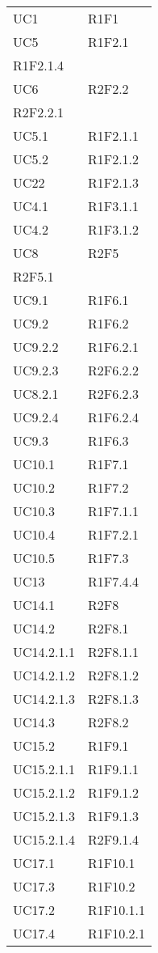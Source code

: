 \begin{longtable}{|C{6.5cm}|C{6.5cm}|}
	\tabularnewline

	UC1 & R1F1 \\
	UC5 & \centering R1F2.1 \\ R1F2.1.4 \tabularnewline
	UC6 & \centering R2F2.2 \\ R2F2.2.1 \tabularnewline
	UC5.1 & R1F2.1.1 \\
	UC5.2 & R1F2.1.2 \\
	UC22 & R1F2.1.3 \\
	UC4.1 & R1F3.1.1 \\
	UC4.2 & R1F3.1.2 \\
	UC8 & \centering R2F5 \\ R2F5.1 \tabularnewline
	UC9.1 & R1F6.1 \\
    UC9.2 & R1F6.2 \\
    UC9.2.2 & R1F6.2.1 \\
    UC9.2.3 & R2F6.2.2 \\
    UC8.2.1 & R2F6.2.3 \\
    UC9.2.4 & R1F6.2.4 \\
	UC9.3 & R1F6.3 \\
	UC10.1 & R1F7.1 \\
	UC10.2 & R1F7.2 \\
	UC10.3 & R1F7.1.1 \\
	UC10.4 & R1F7.2.1 \\
	UC10.5 & R1F7.3 \\
	UC13 & R1F7.4.4 \\
	UC14.1 & R2F8 \\
	UC14.2 & R2F8.1 \\
	UC14.2.1.1 & R2F8.1.1 \\
	UC14.2.1.2 & R2F8.1.2 \\
	UC14.2.1.3 & R2F8.1.3 \\
	UC14.3 & R2F8.2 \\
	UC15.2 & R1F9.1 \\
	UC15.2.1.1 & R1F9.1.1 \\
	UC15.2.1.2 & R1F9.1.2 \\
	UC15.2.1.3 & R1F9.1.3 \\
	UC15.2.1.4 & R2F9.1.4 \\
	UC17.1 & R1F10.1 \\
	UC17.3 & R1F10.2 \\
	UC17.2 & R1F10.1.1 \\
	UC17.4 & R1F10.2.1 \\

\end{longtable}
